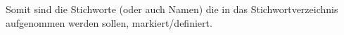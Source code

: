 
Somit sind die Stichworte (oder auch Namen) die in das Stichwortverzeichnis aufgenommen werden sollen, markiert/definiert. 
